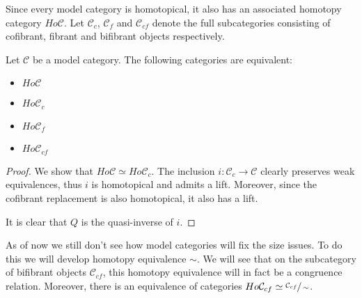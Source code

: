 \documentclass[../thesis.tex]{subfiles}
\begin{document}
            Since every model category is homotopical, it also has an associated homotopy category $Ho\mathcal{C}$. Let $\mathcal{C}_c$, $\mathcal{C}_f$ and $\mathcal{C}_{cf}$ denote the full subcategories consisting of cofibrant, fibrant and bifibrant objects respectively.

            \begin{proposition}
                Let $\mathcal{C}$ be a model category. The following categories are equivalent:
                \begin{itemize}
                    \item $Ho\mathcal{C}$
                    \item $Ho\mathcal{C}_c$
                    \item $Ho\mathcal{C}_f$
                    \item $Ho\mathcal{C}_{cf}$
                \end{itemize}
            \end{proposition}

            \begin{proof}
                We show that $Ho\mathcal{C} \simeq Ho\mathcal{C}_c$. The inclusion $i:\mathcal{C}_c\rightarrow \mathcal{C}$ clearly preserves weak equivalences, thus $i$ is homotopical and admits a lift. Moreover, since the cofibrant replacement is also homotopical, it also has a lift.

                \begin{center}
                \end{center}

                It is clear that $Q$ is the quasi-inverse of $i$.

            \end{proof}

            As of now we still don't see how model categories will fix the size issues. To do this we will develop homotopy equivalence $\sim$. We will see that on the subcategory of bifibrant objects $\mathcal{C}_{cf}$, this homotopy equivalence will in fact be a congruence relation. Moreover, there is an equivalence of categories $Ho\mathcal{C}_{cf}\simeq \sfrac{\mathcal{C}_{cf}}{\sim}$.
\end{document}
